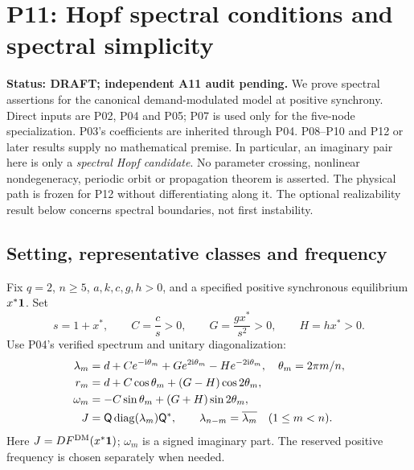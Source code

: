 
\section{P11: Hopf spectral conditions and spectral simplicity}
\label{sec:P11}
\noindent\textbf{Status: DRAFT; independent A11 audit pending.}
We prove spectral assertions for the canonical demand-modulated model at
positive synchrony. Direct inputs are P02, P04 and P05; P07 is used only
for the five-node specialization. P03's coefficients are inherited through
P04. P08--P10 and P12 or later results supply no mathematical premise.
In particular, an imaginary pair here is only a \emph{spectral Hopf
candidate}. No parameter crossing, nonlinear nondegeneracy, periodic
orbit or propagation theorem is asserted. The physical path is frozen for
P12 without differentiating along it. The optional realizability result
below concerns spectral boundaries, not first instability.

\subsection{Setting, representative classes and frequency}
\label{slot:P11-1}
Fix $q=2$, $n\ge5$, $a,k,c,g,h>0$, and a specified positive synchronous
equilibrium $x^*\mathbf{1}$. Set
\begin{equation}
 s=1+x^*,\qquad C=\frac cs>0,\qquad
 G=\frac{gx^*}{s^2}>0,\qquad H=hx^*>0.
 \label{eq:P11-effective}
\end{equation}
Use P04's verified spectrum and unitary diagonalization:
\begin{align}
 \lambda_m&=d+Ce^{-\mathrm{i}\theta_m}+Ge^{2\mathrm{i}\theta_m}
                       -He^{-2\mathrm{i}\theta_m},\quad \theta_m=2\pi m/n,
                       \label{eq:P11-input}\\
 r_m&=d+C\cos\theta_m+(G-H)\cos2\theta_m,\nonumber\\
 \omega_m&=-C\sin\theta_m+(G+H)\sin2\theta_m,\nonumber\\
 J&=\mathsf{Q}\operatorname{diag}(\lambda_m)\mathsf{Q}^*,\qquad
 \lambda_{n-m}=\overline{\lambda_m}\quad(1\le m<n).\nonumber
\end{align}
Here $J=DF^{\mathrm{DM}}(x^*\mathbf{1})$; $\omega_m$ is a signed imaginary part.
The reserved positive frequency is chosen separately when needed.


